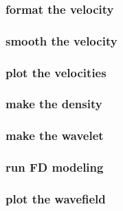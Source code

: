 \begin{frame} \frametitle{format the velocity}

\end{frame}
\cwpnote{}

\begin{frame} \frametitle{smooth the velocity}

\end{frame}
\cwpnote{}

\begin{frame} \frametitle{plot the velocities}

\end{frame}
\cwpnote{}

\begin{frame}  \end{frame}
\begin{frame}  \end{frame}

\begin{frame} \frametitle{make the density}

\end{frame}
\cwpnote{}

\begin{frame} \frametitle{make the wavelet}

\end{frame}
\cwpnote{}

\begin{frame}  \end{frame}

\begin{frame} \frametitle{run FD modeling}

\end{frame}
\cwpnote{}

\begin{frame} \frametitle{plot the wavefield}

\end{frame}
\cwpnote{}

